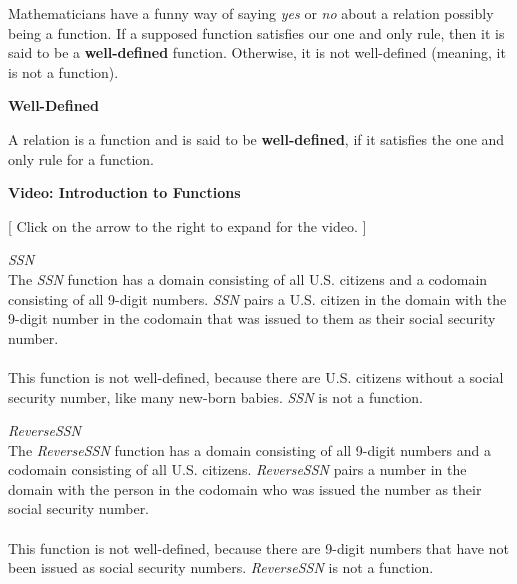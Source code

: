 \documentclass{ximera}
\begin{document}
Mathematicians have a funny way of saying \textit{yes} or \textit{no} about a relation possibly being a function. If a supposed function satisfies our one and only rule, then it is said to be a \textbf{well-defined} function.  Otherwise, it is not well-defined (meaning, it is not a function).




\begin{definition} \textbf{\textcolor{green!50!black}{Well-Defined}}

A relation is a function and is said to be \textbf{well-defined}, if it satisfies the one and only rule for a function.
\end{definition}













\begin{explanation} \textbf{Video: Introduction to Functions}

[ Click on the arrow to the right to expand for the video. ]
\begin{expandable} 

\begin{center}
\end{center}

\end{expandable}
\end{explanation}






\begin{example} \textit{SSN} \\
The \textit{SSN} function has a domain consisting of all U.S. citizens and a codomain consisting of all 9-digit numbers.  \textit{SSN} pairs a U.S. citizen in the domain with the 9-digit number in the codomain that was issued to them as their social security number. 
\\ \\ 
This function is not well-defined, because there are U.S. citizens without a social security number, like many new-born babies.   \textit{SSN} is not a function.
\end{example}


\begin{example} \textit{ReverseSSN} \\
The \textit{ReverseSSN} function has a domain consisting of all 9-digit numbers and a codomain consisting of all U.S. citizens.  \textit{ReverseSSN} pairs a number in the domain with the person in the codomain who was issued the number as their social security number. 
\\ \\ 
This function is not well-defined, because there are 9-digit numbers that have not been issued as social security numbers.  \textit{ReverseSSN} is not a function.
\end{example}
\end{document}
